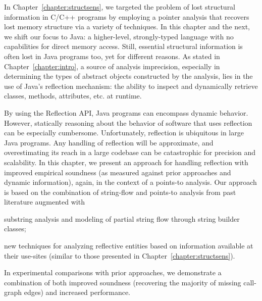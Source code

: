 \label{chapter:reflection}

In Chapter~\ref{chapter:structsens}, we targeted the problem of lost
structural information in C/C++ programs by employing a pointer
analysis that recovers lost memory structure via a variety of
techniques. In this chapter and the next, we shift our focus to Java:
a higher-level, strongly-typed language with no capabilities for direct
memory access.
%
Still, essential structural information is often lost in Java programs
too, yet for different reasons. As stated in
Chapter~\ref{chapter:intro}, a source of analysis imprecision,
especially in determining the types of abstract objects constructed by
the analysis, lies in the use of Java's reflection mechanism: the
ability to inspect and dynamically retrieve classes, methods, attributes,
etc. at runtime.

By using the Reflection API, Java programs can encompass dynamic
behavior. However, statically reasoning about the behavior of software
that uses reflection can be especially cumbersome.
%
Unfortunately, reflection is ubiquitous in large Java programs.
%
Any handling of reflection will be approximate, and overestimating its
reach in a large codebase can be catastrophic for precision and
scalability. In this chapter, we present an approach for handling
reflection with improved empirical soundness (as measured against
prior approaches and dynamic information), again, in the context of a
points-to analysis. Our approach is based on the combination of
string-flow and points-to analysis from past literature augmented with
\begin{inparaenum}[(a)]
\item substring analysis and modeling of partial string flow through
  string builder classes;
\item new techniques for analyzing reflective entities based on
  information available at their use-sites (similar to those presented
  in Chapter~\ref{chapter:structsens}).
\end{inparaenum}
In experimental comparisons with prior approaches, we demonstrate a
combination of both improved soundness (recovering the majority of
missing call-graph edges) and increased performance.


